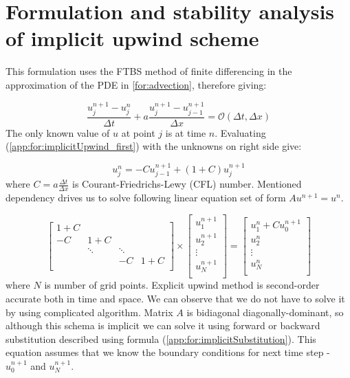 \section{Formulation and stability analysis of implicit upwind scheme}
	This formulation uses the FTBS method of finite differencing in the approximation of the PDE in \ref{for:advection}, therefore giving:
	
	\begin{equation}
		\label{app:for:implicitUpwind_first}
		\frac{u_j^{n+1} - u_j^n}{\Delta t} + a\frac{u_j^{n+1} - u_{j-1}^{n+1}}{\Delta x} = \mathcal{O}(\Delta t, \Delta x)
	\end{equation}	
	The only known value of $u$ at point $j$ is at time $n$. Evaluating (\ref{app:for:implicitUpwind_first}) with the unknowns on right side give:
	
	\begin{equation}
		\label{app:for:implicitUpwind_solution}
		u_j^n = -Cu_{j-1}^{n+1} + (1+C)u_j^{n+1}
	\end{equation}
	where $C=a\frac{\Delta t}{\Delta x}$ is Courant-Friedrichs-Lewy (CFL) number.
	Mentioned dependency drives us to solve following linear equation set of form $Au^{n+1} = u^n$.
	
	\begin{equation}
		\begin{bmatrix}
			1+C & & & \\
			-C & 1+C & & \\ 
			& \ddots & \ddots \\
			& & -C & 1+C \\					
		\end{bmatrix} 
		\times
		\begin{bmatrix}
			u_1^{n+1} \\
			u_2^{n+1} \\
			\vdots	\\
			u_N^{n+1}\\
		\end{bmatrix}
			=
		\begin{bmatrix}
			u_1^{n} + C u_0^{n+1}\\
			u_2^{n} \\
			\vdots	\\
			u_N^{n}\\
		\end{bmatrix}
	\end{equation} 	
	where $N$ is number of grid points.	
	Explicit upwind method is second-order accurate both in time and space. We can observe that we do not have to solve it by using complicated algorithm. Matrix $A$ is bidiagonal diagonally-dominant, so although this schema is implicit we can solve it using forward or backward substitution described using formula (\ref{app:for:implicitSubstitution}). This equation assumes that we know the boundary conditions for next time step - $u_0^{n+1}$ and $u_N^{n+1}$.
	
